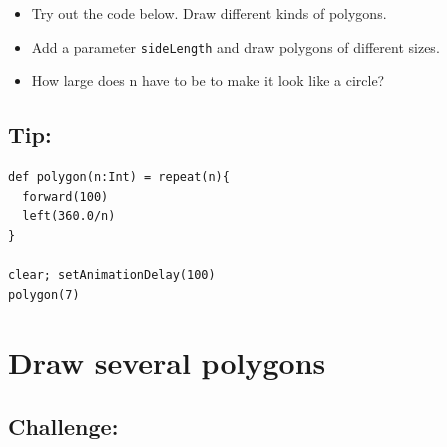 \begin{itemize}

\item {Try out the code below. Draw different kinds of polygons.}
\item {Add a parameter \lstinline{sideLength} and draw polygons of different sizes.}
\item {How large does n have to be to make it look like a circle?}

\end{itemize}


\section*{\color{OliveGreen}Tip:}

\begin{lstlisting}[basicstyle={\ttfamily\fontsize{18}{22}\selectfont},numbers=none]
def polygon(n:Int) = repeat(n){
  forward(100)
  left(360.0/n)
}

clear; setAnimationDelay(100)
polygon(7)
\end{lstlisting}
        

  
\chapter{Draw several polygons}\section*{\color{BrickRed}Challenge:}


